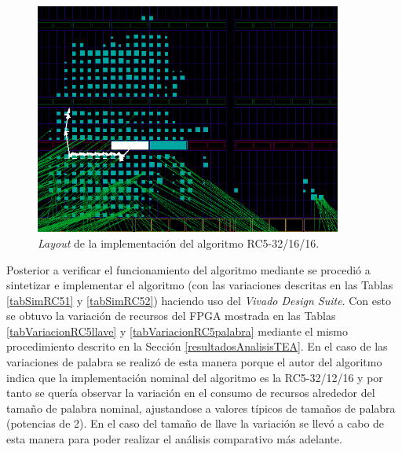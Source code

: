 \begin{figure}
	\includegraphics[width=0.9\textwidth]{./images/fig32_16_16_layout}
	\caption{\textit{Layout} de la implementación del algoritmo RC5-32/16/16.}
	\label{fig32_16_16_layout}
\end{figure}

Posterior a verificar el funcionamiento del algoritmo mediante se procedió a sintetizar e implementar el algoritmo (con las variaciones descritas en las Tablas \ref{tabSimRC51} y \ref{tabSimRC52}) haciendo uso del \textit{Vivado Design Suite}. Con esto se obtuvo la variación de recursos del FPGA mostrada en las Tablas \ref{tabVariacionRC5llave} y \ref{tabVariacionRC5palabra} mediante el mismo procedimiento descrito en la Sección \ref{resultadosAnalisisTEA}. En el caso de las variaciones de palabra se realizó de esta manera porque el autor del algoritmo indica que la implementación nominal del algoritmo es la RC5-32/12/16  y por tanto se quería observar la variación en el consumo de recursos alrededor del tamaño de palabra nominal, ajustandose a valores típicos de tamaños de palabra (potencias de 2). En el caso del tamaño de llave la variación se llevó a cabo de esta manera para poder realizar el análisis comparativo más adelante.

